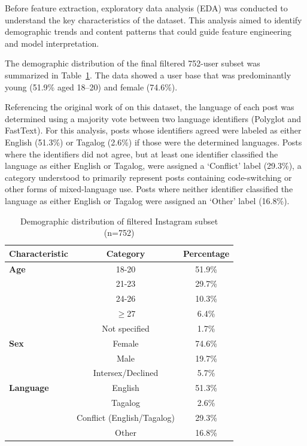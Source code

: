 Before feature extraction, exploratory data analysis (EDA) was conducted to understand the key characteristics of the dataset. This analysis aimed to identify demographic trends and content patterns that could guide feature engineering and model interpretation.

The demographic distribution of the final filtered 752-user subset was summarized in Table~\ref{tab:demo}. The data showed a user base that was predominantly young (51.9\% aged 18–20) and female (74.6\%).

Referencing the original work of \citet{tighe_acorda_2022} on this dataset, the language of each post was determined using a majority vote between two language identifiers (Polyglot and FastText). For this analysis, posts whose identifiers agreed were labeled as either English (51.3\%) or Tagalog (2.6\%) if those were the determined languages. Posts where the identifiers did not agree, but at least one identifier classified the language as either English or Tagalog, were assigned a ‘Conflict’ label (29.3\%), a category understood to primarily represent posts containing code-switching or other forms of mixed-language use. Posts where neither identifier classified the language as either English or Tagalog were assigned an ‘Other’ label (16.8\%).

\begin{table}[h]
	\centering
	\caption{Demographic distribution of filtered Instagram subset (n=752)}
	\label{tab:demo}
	\begin{tabular}{lcc}
		\hline
		\textbf{Characteristic} & \textbf{Category} & \textbf{Percentage} \\ \hline
		\textbf{Age} & 18-20 & 51.9\% \\
		& 21-23 & 29.7\% \\
		& 24-26 & 10.3\% \\
		& $\geq$27 & 6.4\% \\ 
& Not specified & 1.7\% \\ \hline
		\textbf{Sex} & Female & 74.6\% \\
		& Male & 19.7\% \\
		& Intersex/Declined & 5.7\% \\ \hline
		\textbf{Language} & English & 51.3\% \\
		& Tagalog & 2.6\% \\
		& Conflict (English/Tagalog) & 29.3\% \\ 
& Other & 16.8\% \\ \hline
	\end{tabular}
\end{table}


